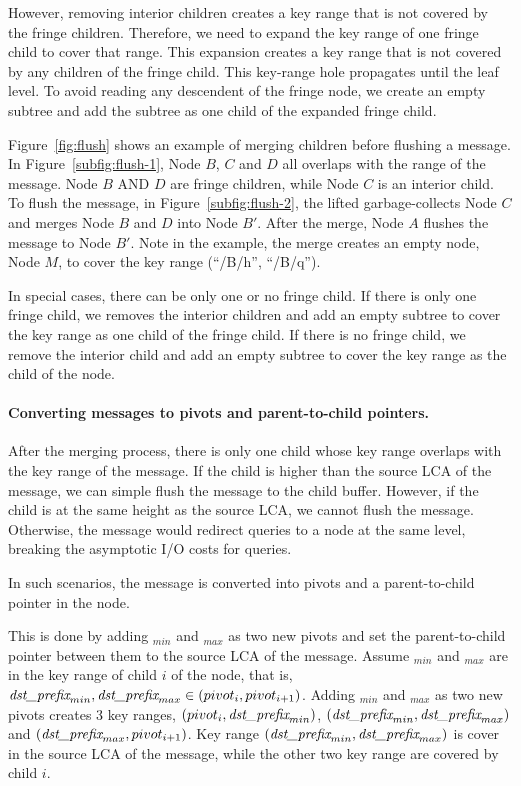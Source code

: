 However, removing interior children creates a key range that is not covered by
the fringe children.
Therefore, we need to expand the key range of one fringe child to cover that
range.
This expansion creates a key range that is not covered by any children of the
fringe child.
This key-range hole propagates until the leaf level.
To avoid reading any descendent of the fringe node, we create an empty subtree
and add the subtree as one child of the expanded fringe child.

Figure~\ref{fig:flush} shows an example of merging children before flushing a
\goto message.
In Figure~\ref{subfig:flush-1}, Node $B$, $C$ and $D$ all overlaps with the
range of the \goto message.
Node $B$ AND $D$ are fringe children, while Node $C$ is an interior child.
To flush the \goto message, in Figure~\ref{subfig:flush-2}, the lifted \bedag
garbage-collects Node $C$ and merges Node $B$ and $D$ into Node $B'$.
After the merge, Node $A$ flushes the \goto message to Node $B'$.
Note in the example, the merge creates an empty node, Node $M$, to cover the key
range (``/B/h'', ``/B/q'').

In special cases, there can be only one or no fringe child.
If there is only one fringe child, we removes the interior children and add
an empty subtree to cover the key range as one child of the fringe child.
If there is no fringe child, we remove the interior child and add an empty
subtree to cover the key range as the child of the node.

\paragraph{Converting \goto messages to pivots and parent-to-child pointers.}
After the merging process, there is only one child whose key range overlaps
with the key range of the \goto message.
If the child is higher than the source LCA of the \goto message,
we can simple flush the \goto message to the child buffer.
However, if the child is at the same height as the source LCA,
we cannot flush the \goto message.
Otherwise, the \goto message would redirect queries to a node at the same level,
breaking the asymptotic I/O costs for queries.

In such scenarios, the \goto message is converted into pivots and a
parent-to-child pointer in the node.

This is done by adding \dpre$_{min}$ and \dpre$_{max}$ as two new pivots and
set the parent-to-child pointer between them to the source LCA of the
\goto message.
Assume \dpre$_{min}$ and \dpre$_{max}$ are in the key range of child $i$ of the node,
that is, $\textit{dst\_prefix}_{min}, \textit{dst\_prefix}_{max} \in (pivot_{i},pivot_{i+1})$.
Adding \dpre$_{min}$ and \dpre$_{max}$ as two new pivots creates 3 key ranges,
$(pivot_{i},\textit{dst\_prefix}_{min})$, $(\textit{dst\_prefix}_{min},\textit{dst\_prefix}_{max})$ and
$(\textit{dst\_prefix}_{max}, pivot_{i+1})$.
Key range $(\textit{dst\_prefix}_{min},\textit{dst\_prefix}_{max})$ is cover in the source LCA of the \goto
message, while the other two key range are covered by child $i$.

